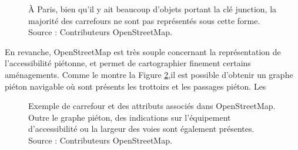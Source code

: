 \begin{figure}
    \centering
    \caption[Les carrefours OSM à Paris.]{À Paris, bien qu'il y ait beaucoup d'objets portant la clé junction, la majorité des carrefours ne sont pas représentés sous cette forme. Source : Contributeurs OpenStreetMap.}
    \label{fig:modelisation_carrefours_osm_paris}
\end{figure}


En revanche, OpenStreetMap est très souple concernant la représentation de l'accessibilité piétonne, et permet de cartographier finement certains aménagements. Comme le montre la Figure \ref{fig:modelisation_anatomie_carrefour_osm},il est possible d'obtenir un graphe piéton navigable où sont présents les trottoirs et les passages piéton. Les 

\begin{figure}
    \centering
    \caption[Anatomie d'un carrefour dans OSM.]{Exemple de carrefour et des attributs associés dans OpenStreetMap. Outre le graphe piéton, des indications sur l'équipement d'accessibilité ou la largeur des voies sont également présentes. Source : Contributeurs OpenStreetMap.}
    \label{fig:modelisation_anatomie_carrefour_osm}
\end{figure}

